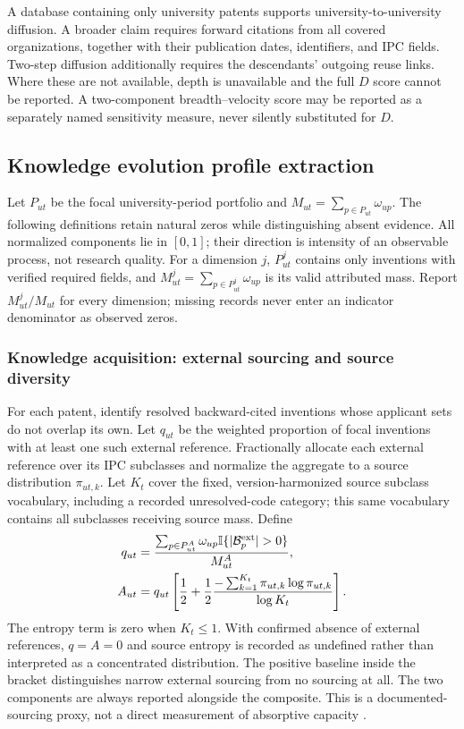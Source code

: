 A database containing only university patents supports university-to-university
diffusion. A broader claim requires forward citations from all covered
organizations, together with their publication dates, identifiers, and IPC fields.
Two-step diffusion additionally requires the descendants' outgoing reuse links.
Where these are not available, depth is unavailable and the full $D$ score cannot
be reported. A two-component breadth--velocity score may be reported as a
separately named sensitivity measure, never silently substituted for $D$.

\subsection{Knowledge evolution profile extraction}\label{sec:indicators}
Let $P_{ut}$ be the focal university-period portfolio and
$M_{ut}=\sum_{p\in P_{ut}}\omega_{up}$. The following definitions retain natural
zeros while distinguishing absent evidence. All normalized components lie in
$[0,1]$; their direction is intensity of an observable process, not research quality.
For a dimension $j$, $P_{ut}^{j}$ contains only inventions with verified required
fields, and $M_{ut}^{j}=\sum_{p\in P_{ut}^{j}}\omega_{up}$ is its valid attributed
mass. Report $M_{ut}^{j}/M_{ut}$ for every dimension; missing records never enter
an indicator denominator as observed zeros.

\subsubsection{Knowledge acquisition: external sourcing and source diversity}
For each patent, identify resolved backward-cited inventions whose applicant sets
do not overlap its own. Let $q_{ut}$ be the weighted proportion of focal inventions
with at least one such external reference. Fractionally allocate each external
reference over its IPC subclasses and normalize the aggregate to a source
distribution $\pi_{ut,k}$. Let $K_t$ cover the fixed, version-harmonized source
subclass vocabulary, including a recorded unresolved-code category; this same
vocabulary contains all subclasses receiving source mass. Define
\begin{align}
 q_{ut}&=\frac{\sum_{p\in P_{ut}^{A}}\omega_{up}
           \ind\{|\mathcal{B}^{\mathrm{ext}}_p|>0\}}{M_{ut}^{A}},\\
 A_{ut}&=q_{ut}\left[\frac12+\frac12
       \frac{-\sum_{k=1}^{K_t}\pi_{ut,k}\log\pi_{ut,k}}{\log K_t}\right].
 \label{eq:acquisition}
\end{align}
The entropy term is zero when $K_t\leq1$. With confirmed absence of external
references, $q=A=0$ and source entropy is recorded as undefined rather than
interpreted as a concentrated distribution. The positive baseline inside the
bracket distinguishes narrow external sourcing from no sourcing at all.
The two components are always reported alongside the composite. This is a
documented-sourcing proxy, not a direct measurement of absorptive capacity
\citep{cohen1990,shannon1948,stirling2007}.

